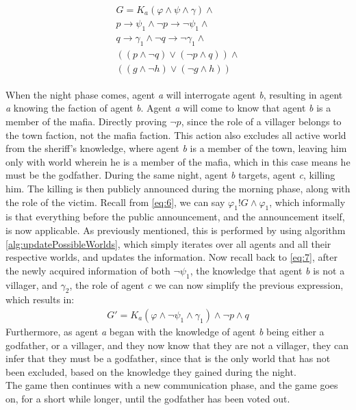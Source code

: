 \begin{align}
	\begin{split}
		G = K_a(\varphi \land \psi \land\gamma)\land                        \\
		p \rightarrow \psi_1 \land \neg p \rightarrow \neg \psi_1 \land     \\
		q \rightarrow \gamma_1 \land \neg q \rightarrow \neg \gamma_1 \land \\
		((p \land \neg q) \lor (\neg p \land q)) \land                      \\
		((g \land \neg h) \lor (\neg g \land h))
		\label{eq:7}
	\end{split}
\end{align}

When the night phase comes, agent \textit{a} will interrogate agent \textit{b},
resulting in agent \textit{a} knowing the faction of agent \textit{b}. Agent
\textit{a} will come to know that agent \textit{b} is a member of the mafia.
Directly proving $\neg p$, since the role of a villager belongs to the town
faction, not the mafia faction. This action also excludes all active world from
the sheriff's knowledge, where agent \textit{b} is a member of the town,
leaving him only with world wherein he is a member of the mafia, which in this
case means he must be the godfather. During the same night, agent \textit{b}
targets, agent \textit{c}, killing him. The killing is then publicly announced
during the morning phase, along with the role of the victim. Recall from
\cref{eq:6}, we can say $\varphi_1!G\land\varphi_1$, which informally is that
everything before the public announcement, and the announcement itself, is now
applicable. As previously mentioned, this is performed by using algorithm
\ref{alg:updatePossibleWorlds}, which simply iterates over all agents and all
their respective worlds, and updates the information. Now recall back to
\cref{eq:7}, after the newly acquired information of both $\neg \psi_1$, the
knowledge that agent \textit{b} is not a villager, and $\gamma_2$, the role of
agent \textit{c} we can now simplify the previous expression, which results in:
\begin{align}
	G' = K_a(\varphi \land \neg \psi_1 \land \gamma_1) \land \neg p \land q
\end{align}
Furthermore, as agent \textit{a} began with the knowledge of agent \textit{b}
being either a godfather, or a villager, and they now know that they are not a
villager, they can infer that they must be a godfather, since that is the only
world that has not been excluded, based on the knowledge they gained during the
night. \\
The game then continues with a new communication phase, and the game goes on,
for a short while longer, until the godfather has been voted out.
